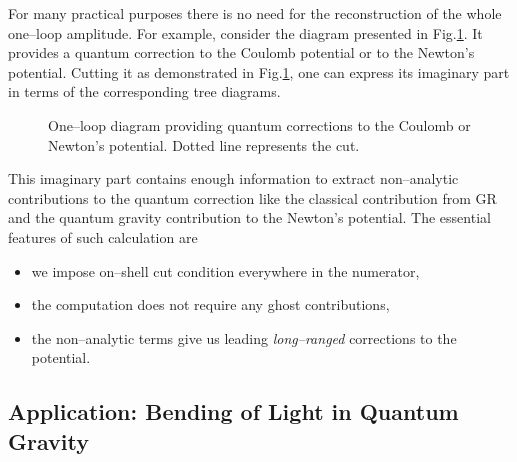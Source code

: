 \documentclass[11pt,a4paper]{article}
\begin{document}
For many practical purposes there is no need for the reconstruction of the whole one--loop amplitude. For example, consider the diagram presented in Fig.\ref{Fig:cut}. It provides a quantum correction to the Coulomb potential or to the Newton's potential. Cutting it as demonstrated in Fig.\ref{Fig:cut}, one can express its imaginary part in terms of the corresponding tree diagrams.
\begin{figure}[h!]
\begin{center}
\begin{minipage}[h]{0.9\linewidth}
\caption{One--loop diagram providing quantum corrections to the Coulomb or Newton's potential. Dotted line represents the cut.}
\label{Fig:cut}
\end{minipage}
\end{center}
\end{figure}
This imaginary part contains enough information to extract non--analytic contributions to the quantum correction like the classical contribution from GR and the quantum gravity contribution to the Newton's potential. The essential features of such calculation are
\begin{itemize}
\item we impose on--shell cut condition everywhere in the numerator,
\item the computation does not require any ghost contributions,
\item the non--analytic terms give us leading \textit{long--ranged} corrections to the potential.
\end{itemize}

\subsection{Application: Bending of Light in Quantum Gravity}
\end{document}
